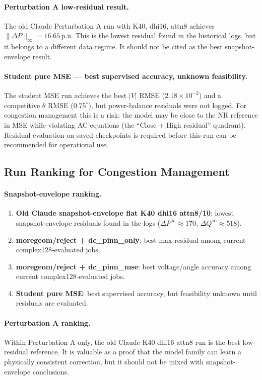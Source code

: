 \documentclass{article}
\begin{document}
\paragraph{Perturbation A low-residual result.}
The old Claude Perturbation A run with K40, dhi16, attn8 achieves
$\|\Delta P\|_\infty = 16.65$\,p.u.  This is the lowest residual found in
the historical logs, but it belongs to a different data regime.  It should
not be cited as the best snapshot-envelope result.

\paragraph{Student pure MSE --- best supervised accuracy, unknown feasibility.}
The student MSE run achieves the best $|V|$ RMSE ($2.18 \times 10^{-2}$)
and a competitive $\theta$ RMSE ($0.75^\circ$), but power-balance residuals
were not logged.  For congestion management this is a risk: the model may be
close to the NR reference in MSE while violating AC equations (the ``Close
+ High residual'' quadrant).  Residual evaluation on saved checkpoints is
required before this run can be recommended for operational use.

\subsection{Run Ranking for Congestion Management}

\paragraph{Snapshot-envelope ranking.}
\begin{enumerate}
  \item \textbf{Old Claude snapshot-envelope flat K40 dhi16 attn8/10}:
    lowest snapshot-envelope residuals found in the logs
    ($\Delta P^\infty \approx 170$, $\Delta Q^\infty \approx 518$).
  \item \textbf{moregeom/reject + dc\_pinn\_only}: best max residual among
    current complex128-evaluated jobs.
  \item \textbf{moregeom/reject + dc\_pinn\_mse}: best voltage/angle accuracy
    among current complex128-evaluated jobs.
  \item \textbf{Student pure MSE}: best supervised accuracy, but feasibility
    unknown until residuals are evaluated.
\end{enumerate}

\paragraph{Perturbation A ranking.}
Within Perturbation A only, the old Claude K40 dhi16 attn8 run is the best
low-residual reference.  It is valuable as a proof that the model family can
learn a physically consistent correction, but it should not be mixed with
snapshot-envelope conclusions.
\end{document}
